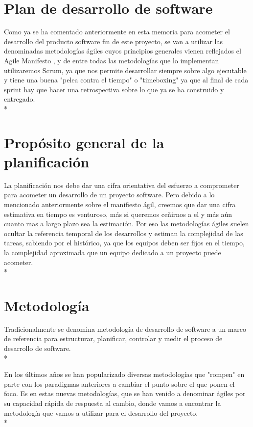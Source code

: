 \documentclass[../pfc.tex]{subfiles}
\begin{document}
	
	\section{Plan de desarrollo de software}
	
	Como ya se ha comentado anteriormente en esta memoria para acometer el desarrollo del producto software fin de este proyecto, se van a utilizar las denominadas metodologías ágiles cuyos principios generales vienen reflejados el Agile Manifesto \cite{agile}, y de entre todas las metodologías que lo implementan utilizaremos Scrum, ya que nos permite desarrollar siempre sobre algo ejecutable y tiene una buena "pelea contra el tiempo" o "timeboxing" ya que al final de cada sprint hay que hacer una retrospectiva sobre lo que ya se ha construido y entregado.\\*

	\section{Propósito general de la planificación}
	
	La planificación nos debe dar una cifra orientativa del esfuerzo a comprometer para acometer un desarrollo de un proyecto software. Pero debido a lo mencionado anteriormente sobre el manifiesto ágil, creemos que dar una cifra estimativa en tiempo es venturoso, más si queremos ceñirnos a el y más aún cuanto mas a largo plazo sea la estimación. Por eso las metodologías ágiles suelen ocultar la referencia temporal de los desarrollos y estiman la complejidad de las tareas, sabiendo por el histórico, ya que los equipos deben ser fijos en el tiempo, la complejidad aproximada que un equipo dedicado a un proyecto puede acometer.\\*
	
	\section{Metodología }
	
	Tradicionalmente se denomina metodología de desarrollo de software a un marco de referencia para estructurar, planificar, controlar y medir el proceso de desarrollo de software.\cite{wiki-metodologia}\\*
	
	En los últimos años se han popularizado diversas metodologías que "rompen" en parte con los paradigmas anteriores a cambiar el punto sobre el que ponen el foco. Es en estas nuevas metodologías, que se han venido a denominar ágiles por su capacidad rápida de respuesta al cambio, donde vamos a encontrar la metodología que vamos a utilizar para el desarrollo del proyecto.\\*
	
\end{document}
